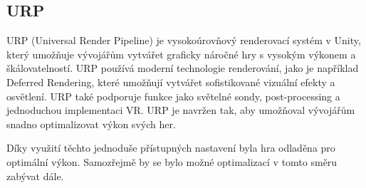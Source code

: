 \subsection{URP}
URP (Universal Render Pipeline) je vysokoúrovňový renderovací systém v Unity, který umožňuje vývojářům vytvářet graficky náročné hry s vysokým výkonem a škálovatelností. URP používá moderní technologie renderování, jako je například Deferred Rendering, které umožňují vytvářet sofistikované vizuální efekty a osvětlení. URP také podporuje funkce jako světelné sondy, post-processing a jednoduchou implementaci VR. URP je navržen tak, aby umožňoval vývojářům snadno optimalizovat výkon svých her. \cite{unity_urp}

Díky využití těchto jednoduše přístupných nastavení byla hra odladěna pro optimální výkon. Samozřejmě by se bylo možné optimalizací v tomto směru zabývat dále.
